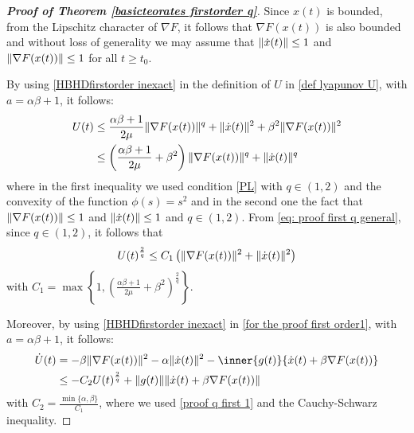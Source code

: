 \documentclass[reqno]{amsart}
\theoremstyle{plain}
\theoremstyle{definition}
\theoremstyle{remark}
\DeclarePairedDelimiter{\norm}{\lVert}{\rVert}	%
\begin{document}
\begin{proof}[\textbf{Proof of Theorem \ref{basicteorates firstorder q}}] 
Since $x(t)$ is bounded, from the Lipschitz character of $\nabla F$, it follows that $\nabla F(x(t))$ is also bounded and without loss of generality we may assume that $\norm{\dot{x}(t)}\leq 1$ and $\norm{\nabla F(x(t))}\leq 1$ for all $t\geq t_{0}$.
	
By using \eqref{HBHDfirstorder inexact} in the definition of $U$ in \eqref{def lyapunov U}, with $a=\alpha\beta+1$, it follows:
\begin{equation}\label{eq: proof first q general}
	\begin{aligned}
		U(t)
		& \leq  \frac{\alpha\beta+1}{2\mu}\norm{\nabla F(x(t))}^{q} + \norm{\dot{x}(t)}^{2} +\beta^{2}\norm{\nabla F(x(t))}^{2}  \\
		& \leq  \left(\frac{\alpha\beta+1}{2\mu}+\beta^{2}\right)\norm{\nabla F(x(t))}^{q} + \norm{\dot{x}(t)}^{q} 
	\end{aligned}
\end{equation}
where in the first inequality we used condition \ref{PL} with $q\in(1,2)$ and the convexity of the function $\phi(s)=s^{2}$ and in the second one the fact that $\norm{\nabla F(x(t))}\leq 1$ and $\norm{\dot{x}(t)}\leq 1$ and $q\in (1,2)$. 
From \eqref{eq: proof first q general}, since $q\in(1,2)$, it follows that
\begin{equation}\label{proof q first 1}
	U(t)^{\frac{2}{q}} \leq C_{1}\left(\norm{\nabla F(x(t))}^{2} +\norm{\dot{x}(t)}^{2}\right)
\end{equation}	
with $C_{1}=\max\left\{1,\left(\frac{\alpha\beta+1}{2\mu}+\beta^{2}\right)^{\frac{2}{q}}\right\}$.
	
Moreover, by using \eqref{HBHDfirstorder inexact} in \eqref{for the proof first order1}, with $a=\alpha\beta+1$, it follows:
\begin{equation}\label{proof general q final}
	\begin{aligned}
		\dot{U}(t) &= -\beta\norm{\nabla F(x(t))}^{2} -\alpha\norm{\dot{x}(t)}^{2} -\inner{g(t)}{\dot{x}(t)+\beta\nabla F(x(t))} \\
		&\leq -C_{2}U(t)^{\frac{2}{q}}
			+\norm{g(t)}\norm{\dot{x}(t)+\beta\nabla F(x(t))}
	\end{aligned}
\end{equation}
with $C_{2}=\frac{\min\{\alpha,\beta\}}{C_{1}}$, where we used \eqref{proof q first 1} and the Cauchy-Schwarz inequality.
	

\end{proof}
\end{document}
